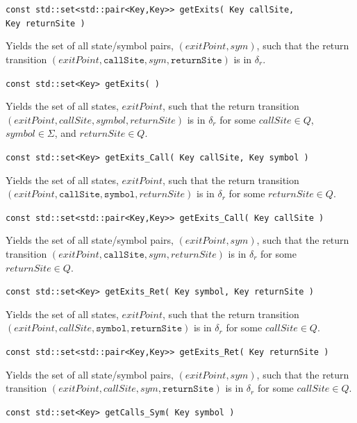 \documentclass{llncs}
\begin{document}
\begin{description}
  \item\texttt{const std::set<std::pair<Key,Key>> getExits( Key callSite,\\ \hspace*{3.25cm} Key returnSite )} \nopagebreak

    Yields the set of all state/symbol pairs, $(exitPoint,sym)$, such that
    the return transition
    $(exitPoint,\texttt{callSite},sym,\texttt{returnSite})$ is in $\delta_r$.

  \item\texttt{const std::set<Key> getExits( )} \nopagebreak

    Yields the set of all states, $exitPoint$, such that the return
    transition $(exitPoint,callSite,symbol,returnSite)$ is in $\delta_r$ for
    some $callSite \in Q$, $symbol \in \Sigma$, and $returnSite \in Q$.

  \item\texttt{const std::set<Key> getExits\_Call( Key callSite, Key symbol )} \nopagebreak

    Yields the set of all states, $exitPoint$, such that the return
    transition $(exitPoint,\texttt{callSite},\texttt{symbol},returnSite)$ is
    in $\delta_r$ for some $returnSite \in Q$.

  \item\texttt{const std::set<std::pair<Key,Key>> getExits\_Call( Key callSite )} \nopagebreak

    Yields the set of all state/symbol pairs, $(exitPoint,sym)$, such that
    the return transition $(exitPoint,\texttt{callSite},sym,returnSite)$ is
    in $\delta_r$ for some $returnSite \in Q$.

  \item\texttt{const std::set<Key> getExits\_Ret( Key symbol, Key returnSite )} \nopagebreak

    Yields the set of all states, $exitPoint$, such that the return
    transition $(exitPoint,callSite,\texttt{symbol},\texttt{returnSite})$ is
    in $\delta_r$ for some $callSite \in Q$.

  \item\texttt{const std::set<std::pair<Key,Key>> getExits\_Ret( Key returnSite )} \nopagebreak

    Yields the set of all state/symbol pairs, $(exitPoint,sym)$, such that
    the return transition $(exitPoint,callSite,sym,\texttt{returnSite})$ is
    in $\delta_r$ for some $callSite \in Q$.

  \item\texttt{const std::set<Key> getCalls\_Sym( Key symbol )} \nopagebreak


\end{description}
\end{document}

